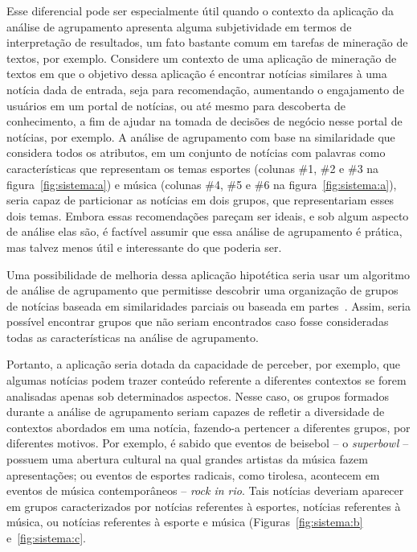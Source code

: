 \documentclass[
    12pt,                %
    oneside,            %
    a4paper,            %
    english,            %
    brazil                %
    ]{abntex2ppgsi}
\begin{document}
Esse diferencial pode ser especialmente útil quando o contexto da aplicação da análise de agrupamento apresenta alguma subjetividade em termos de interpretação de resultados, um fato bastante comum em tarefas de mineração de textos, por exemplo.
Considere um contexto de uma aplicação de mineração de textos em que o objetivo dessa aplicação é encontrar notícias similares à uma notícia dada de entrada, seja para recomendação, aumentando o engajamento de usuários em um portal de notícias, ou até mesmo para descoberta de conhecimento, a fim de ajudar na tomada de decisões de negócio nesse portal de notícias, por exemplo.
A análise de agrupamento com base na similaridade que considera todos os atributos, em um conjunto de notícias com palavras como características que representam os temas esportes (colunas \#1, \#2 e \#3 na figura~\ref{fig:sistema:a}) e música (colunas \#4, \#5 e \#6 na figura~\ref{fig:sistema:a}), seria capaz de particionar as notícias em dois grupos, que representariam esses dois temas.
Embora essas recomendações pareçam ser ideais, e sob algum aspecto de análise elas são, é factível assumir que essa análise de agrupamento é prática, mas talvez menos útil e interessante do que poderia ser.

Uma possibilidade de melhoria dessa aplicação hipotética seria usar um algoritmo de análise de agrupamento que permitisse descobrir uma organização de grupos de notícias baseada em similaridades parciais ou baseada em partes~\cite{Franca2010,Ho2008}.
Assim, seria possível encontrar grupos que não seriam encontrados caso fosse consideradas todas as características na análise de agrupamento.

Portanto, a aplicação seria dotada da capacidade de perceber, por exemplo, que algumas notícias podem trazer conteúdo referente a diferentes contextos se forem analisadas apenas sob determinados aspectos.
Nesse caso, os grupos formados durante a análise de agrupamento seriam capazes de refletir a diversidade de contextos abordados em uma notícia, fazendo-a pertencer a diferentes grupos, por diferentes motivos.
Por exemplo, é sabido que eventos de beisebol -- o \textit{superbowl} -- possuem uma abertura cultural na qual grandes artistas da música fazem apresentações; ou eventos de esportes radicais, como tirolesa, acontecem em eventos de música contemporâneos -- \textit{rock in rio}.
Tais notícias deveriam aparecer em grupos caracterizados por notícias referentes à esportes, notícias referentes à música, ou notícias referentes à esporte e música (Figuras~\ref{fig:sistema:b} e~\ref{fig:sistema:c}.
\end{document}
